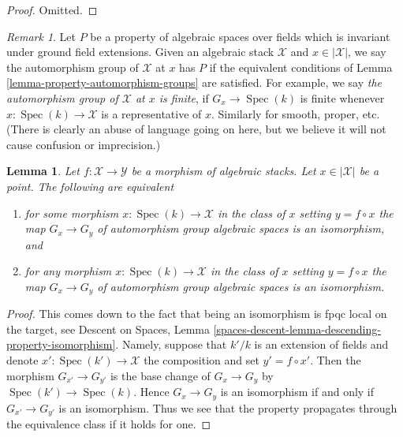 \documentclass{stacks-project}
\theoremstyle{plain}
\newtheorem{lemma}[subsection]{Lemma}
\theoremstyle{definition}
\theoremstyle{remark}
\newtheorem{remark}[subsection]{Remark}
\numberwithin{equation}{subsection}
\def\Spec{\mathop{\mathrm{Spec}}}
\begin{document}
\begin{proof}
Omitted.
\end{proof}

\begin{remark}
\label{remark-property-automorphism-groups}
Let $P$ be a property of algebraic spaces over fields which is invariant
under ground field extensions. Given an algebraic stack $\mathcal{X}$
and $x \in |\mathcal{X}|$, we say the automorphism group of $\mathcal{X}$
at $x$ has $P$ if the equivalent conditions of
Lemma \ref{lemma-property-automorphism-groups} are satisfied.
For example, we say {\it the automorphism group of $\mathcal{X}$
at $x$ is finite}, if $G_x \to \Spec(k)$ is finite whenever
$x : \Spec(k) \to \mathcal{X}$ is a representative of $x$.
Similarly for smooth, proper, etc.
(There is clearly an abuse of language going on here, but we
believe it will not cause confusion or imprecision.)
\end{remark}

\begin{lemma}
\label{lemma-iso-automorphism-groups}
Let $f : \mathcal{X} \to \mathcal{Y}$ be a morphism of algebraic stacks.
Let $x \in |\mathcal{X}|$ be a point. The following are equivalent
\begin{enumerate}
\item for some morphism $x : \Spec(k) \to \mathcal{X}$ in the
class of $x$ setting $y = f \circ x$ the map
$G_x \to G_y$ of automorphism group algebraic spaces
is an isomorphism, and
\item for any morphism $x : \Spec(k) \to \mathcal{X}$ in the
class of $x$ setting $y = f \circ x$ the map
$G_x \to G_y$ of automorphism group algebraic spaces
is an isomorphism.
\end{enumerate}
\end{lemma}

\begin{proof}
This comes down to the fact that being an isomorphism
is fpqc local on the target, see
Descent on Spaces, Lemma
\ref{spaces-descent-lemma-descending-property-isomorphism}.
Namely, suppose that $k'/k$ is an extension of fields and
denote $x' : \Spec(k') \to \mathcal{X}$ the composition
and set $y' = f \circ x'$.
Then the morphism $G_{x'} \to G_{y'}$ is the base change
of $G_x \to G_y$ by $\Spec(k') \to \Spec(k)$.
Hence $G_x \to G_y$ is an isomorphism
if and only if $G_{x'} \to G_{y'}$ is an isomorphism.
Thus we see that the property propagates through the
equivalence class if it holds for one.
\end{proof}
\end{document}

